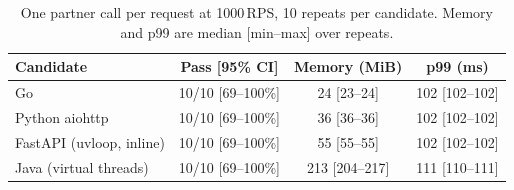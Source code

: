 \begin{table}[t]
\caption{One partner call per request at 1000\,RPS, 10 repeats per candidate. Memory and p99 are median [min--max] over repeats.}
\label{tab:repeatsmem}
\centering\small
\begin{tabular}{lccc}
\toprule
Candidate & Pass [95\% CI] & Memory (MiB) & p99 (ms) \\
\midrule
Go & 10/10 [69--100\%] & 24 [23--24] & 102 [102--102] \\
Python aiohttp & 10/10 [69--100\%] & 36 [36--36] & 102 [102--102] \\
FastAPI (uvloop, inline) & 10/10 [69--100\%] & 55 [55--55] & 102 [102--102] \\
Java (virtual threads) & 10/10 [69--100\%] & 213 [204--217] & 111 [110--111] \\
\bottomrule
\end{tabular}
\end{table}
